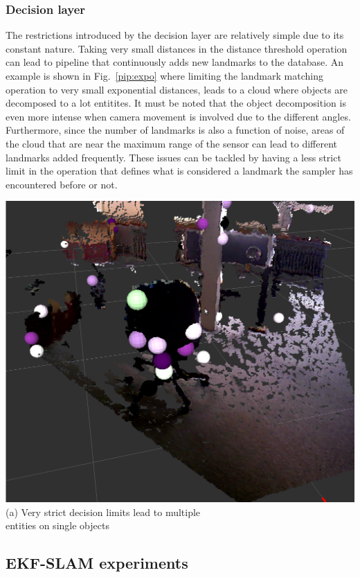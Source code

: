 \documentclass[twoside,hidelinks]{article}
\begin{document}
\subsubsection{Decision layer}

The restrictions introduced by the decision layer are relatively simple due to its constant nature. Taking very small distances in the distance threshold operation can lead to pipeline that continuously adds new landmarks to the database. An example is shown in Fig.~\ref{pip:expo} where limiting the landmark matching operation to very small exponential distances, leads to a cloud where objects are decomposed to a lot entitites. It must be noted that the object decomposition is even more intense when camera movement is involved due to the different angles. Furthermore, since the number of landmarks is also a function of noise, areas of the cloud that are near the maximum range of the sensor can lead to different landmarks added frequently. These issues can be tackled by having a less strict limit in the operation that defines what is considered a landmark the sampler has encountered before or not.

\begin{center}

	    \includegraphics[width=.5\textwidth]{monsterchair} \\
	  (a) Very strict decision limits lead to multiple \\
	   entities on single objects \\[6pt]
	
	  \label{pip:expo}

\end{center}


\subsection{EKF-SLAM experiments}
\end{document}
